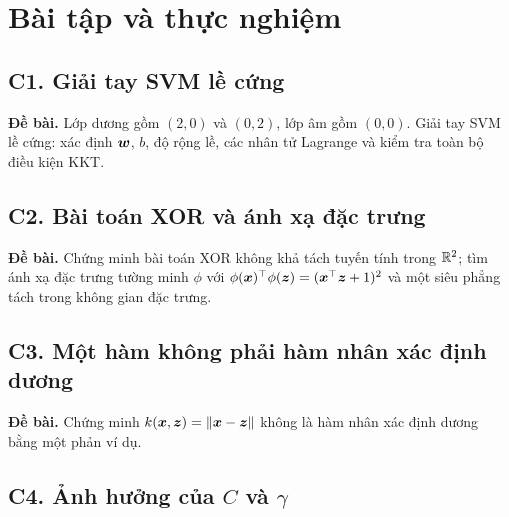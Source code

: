 \section{Bài tập và thực nghiệm}\label{sec:exercises}

\subsection{C1. Giải tay SVM lề cứng}\label{sec:C1}
\textbf{Đề bài.} Lớp dương gồm $(2, 0)$ và $(0, 2)$, lớp âm gồm $(0, 0)$. Giải tay SVM lề cứng:
xác định $\bm{w}$, $b$, độ rộng lề, các nhân tử Lagrange và kiểm tra toàn bộ điều kiện KKT.


\subsection{C2. Bài toán XOR và ánh xạ đặc trưng}\label{sec:C2}
\textbf{Đề bài.} Chứng minh bài toán XOR không khả tách tuyến tính trong $\mathbb{R}^2$; tìm ánh xạ
đặc trưng tường minh $\phi$ với $\phi(\bm{x})^{\top}\phi(\bm{z}) = (\bm{x}^{\top}\bm{z} + 1)^2$ và một siêu phẳng tách
trong không gian đặc trưng.


\subsection{C3. Một hàm không phải hàm nhân xác định dương}\label{sec:C3}
\textbf{Đề bài.} Chứng minh $k(\bm{x}, \bm{z}) = \left\lVert \bm{x} - \bm{z} \right\rVert$ không là hàm nhân xác định dương
bằng một phản ví dụ.


\subsection{\texorpdfstring{C4. Ảnh hưởng của $C$ và $\gamma$}{C4. Ảnh hưởng của C và γ}}\label{sec:C4}

